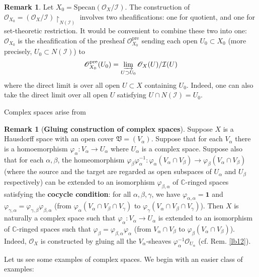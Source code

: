 \documentclass[12pt,b5paper,notitlepage]{report}
\theoremstyle{definition}
\newtheorem{rem}[df]{Remark}
\theoremstyle{plain}
\newcommand{\fk}{\mathfrak}
\newcommand{\mc}{\mathcal}
\newcommand{\id}{\mathbf{1}}
\newcommand{\scr}{\mathscr}
\newcommand{\Cbb}{\mathbb C}
\newcommand{\Specan}{\mathrm{Specan}}
\newcommand{\uph}{\upharpoonright}
\newcommand{\pre}{\mathrm{pre}}
\numberwithin{equation}{section}
\begin{document}
\begin{rem}\label{lb10}
Let $X_0=\Specan(\scr O_X/\mc I)$. The construction of $\scr O_{X_0}=(\scr O_X/\mc I)\uph_{N(\mc I)}$ involves two sheafifications: one for quotient, and one for set-theoretic restriction. It would be convenient to combine these two into one: $\scr O_{X_0}$ is the sheafification of the presheaf $\scr O_{X_0}^\pre$ sending each open $U_0\subset X_0$ (more precisely, $U_0\subset N(\mc I)$) to 
\begin{align}
\scr O_{X_0}^\pre(U_0)=\varinjlim_{U\supset U_0}\scr O_X(U)/\mc I(U)
\end{align}
where the direct limit is over all open $U\subset X$ containing $U_0$. Indeed, one can also take the direct limit over all open $U$ satisfying $U\cap N(\mc I)=U_0$.
\end{rem}



Complex spaces arise from 
\begin{rem}[\textbf{Gluing construction of complex spaces}]\label{lb5}
Suppose $X$ is a Hausdorff space with an open cover $\fk V=(V_\alpha)$. Suppose that for each $V_\alpha$ there is a homoemorphism $\varphi_\alpha:V_\alpha\rightarrow U_\alpha$ where $U_\alpha$ is a complex space. Suppose also that for each $\alpha,\beta$, the homeomorphism $\varphi_\beta\varphi_\alpha^{-1}:\varphi_\alpha(V_\alpha\cap V_\beta)\rightarrow\varphi_\beta(V_\alpha\cap V_\beta)$ (where the source and the target are regarded as open subspaces of $U_\alpha$ and $U_\beta$ respectively) can be extended to an isomorphism $\varphi_{\beta,\alpha}$ of $\Cbb$-ringed spaces satisfying the \textbf{cocycle condition}: for all $\alpha,\beta,\gamma$, we have $\varphi_{\alpha,\alpha}=\id$ and  $\varphi_{\gamma,\alpha}=\varphi_{\gamma,\beta}\varphi_{\beta,\alpha}$ (from $\varphi_\alpha(V_\alpha\cap V_\beta\cap V_\gamma)$ to $\varphi_\gamma(V_\alpha\cap V_\beta\cap V_\gamma)$). Then $X$ is naturally a complex space such that $\varphi_\alpha:V_\alpha\rightarrow U_\alpha$ is extended to an isomorphism  of $\Cbb$-ringed spaces such that $\varphi_\beta=\varphi_{\beta,\alpha}\varphi_\alpha$ (from $V_\alpha\cap V_\beta$ to $\varphi_\beta(V_\alpha\cap V_\beta)$). Indeed, $\scr O_X$ is constructed by gluing all the $V_\alpha$-sheaves $\varphi_\alpha^{-1}\scr O_{U_\alpha}$ (cf. Rem. \ref{lb12}). 
\end{rem}







Let us see some examples of complex spaces. We begin with an easier class of examples:
\end{document}
